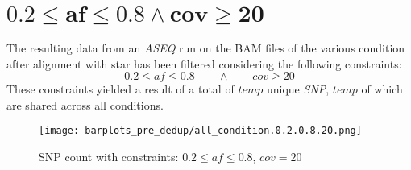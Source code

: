 \documentclass{article}
\begin{document}
\section*{$\mathbf{0.2\le af\le 0.8\land cov\ge 20}$}
The resulting data from an \emph{ASEQ} run on the BAM files of the various condition after alignment with star has been filtered considering the following constraints:
  $$0.2\le af\le 0.8\qquad\land\qquad cov\ge 20$$
	These constraints yielded a result of a total of $temp$ unique \emph{SNP}, $temp$ of which are shared across all conditions.
\begin{figure}[H]
  \texttt{[image: barplots\_pre\_dedup/all\_condition.0.2.0.8.20.png]}
\caption{SNP count with constraints: $0.2\le af \le 0.8$, $cov = 20$ }
\end{figure}

\end{document}
